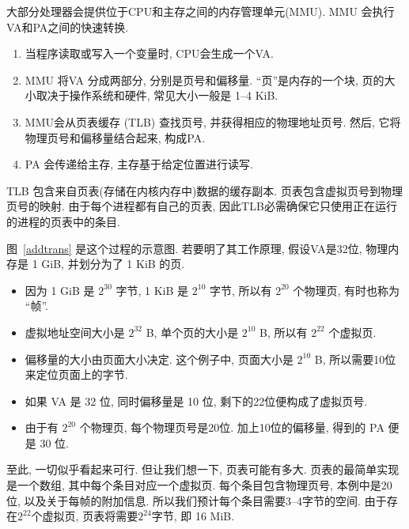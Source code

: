 \documentclass[12pt]{book}
\begin{document}
{大部分处理器会提供位于CPU和主存之间的内存管理单元(MMU).
MMU 会执行VA和PA之间的快速转换.

\begin{enumerate}

\item 当程序读取或写入一个变量时, CPU会生成一个VA.

\item MMU 将VA 分成两部分, 分别是页号和偏移量.
``页''是内存的一个块, 页的大小取决于操作系统和硬件, 常见大小一般是 1--4 KiB.

\item MMU会从页表缓存 (TLB) 查找页号, 并获得相应的物理地址页号.
然后, 它将物理页号和偏移量结合起来, 构成PA.

\item PA 会传递给主存, 主存基于给定位置进行读写.

\end{enumerate}

TLB 包含来自页表(存储在内核内存中)数据的缓存副本.
页表包含虚拟页号到物理页号的映射. 
由于每个进程都有自己的页表, 因此TLB必需确保它只使用正在运行的进程的页表中的条目.

图~\ref{addtrans} 是这个过程的示意图.
若要明了其工作原理, 假设VA是32位, 物理内存是 1 GiB, 并划分为了 1 KiB 的页.

\begin{itemize}

\item 因为 1 GiB 是 $2^{30}$ 字节, 1 KiB 是 $2^{10}$ 字节, 
  所以有 $2^{20}$ 个物理页, 有时也称为 ``帧''.

\item 虚拟地址空间大小是 $2^{32}$ B, 单个页的大小是 $2^{10}$ B, 
  所以有 $2^{22}$ 个虚拟页.

\item 偏移量的大小由页面大小决定.  这个例子中, 页面大小是 $2^{10}$ B, 
  所以需要10位来定位页面上的字节.

\item 如果 VA 是 32 位, 同时偏移量是 10 位, 剩下的22位便构成了虚拟页号.

\item 由于有 $2^{20}$ 个物理页, 每个物理页号是20位. 
  加上10位的偏移量, 得到的 PA 便是 30 位.

\end{itemize}

至此, 一切似乎看起来可行. 但让我们想一下, 页表可能有多大.
页表的最简单实现是一个数组, 其中每个条目对应一个虚拟页.
每个条目包含物理页号, 本例中是20位, 以及关于每帧的附加信息.
所以我们预计每个条目需要3--4字节的空间.
由于存在$2^{22}$个虚拟页, 
页表将需要$2^{24}$字节, 即 16 MiB.

}
\end{document}
